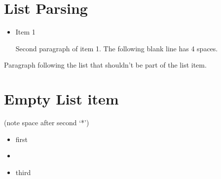 
\def\mytitle{MMD List Parsing Test}


\part{List Parsing}
\label{listparsing}

\begin{itemize}
\item Item 1

Second paragraph of item 1.
The following blank line has 4 spaces.

\end{itemize}

Paragraph following the list that shouldn't be part of the list item.

\part{Empty List item}
\label{emptylistitem}

(note space after second `*')

\begin{itemize}
\item first

\item 

\item third

\end{itemize}




